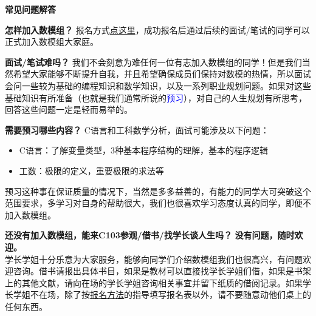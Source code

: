\documentclass[xcolor={usenames,dvipsnames}]{beamer}
\begin{document}
\begin{frame}{\textbf{常见问题解答}}
\begin{alertblock}{\textbf{怎样加入数模组？}}
报名方式\textcolor{red}{\hyperlink{signin}{点这里}}，成功报名后通过后续的面试/笔试的同学可以正式加入数模组大家庭。
\end{alertblock}

\begin{block}{\textbf{面试/笔试难吗？}}
我们不会刻意为难任何一位有志加入数模组的同学！但是我们当然希望大家能够不断提升自我，并且希望确保成员们保持对数模的热情，所以面试会问一些较为基础的编程知识和数学知识，以及一系列职业规划问题。如果对这些基础知识有所准备（也就是我们通常所说的\textcolor{blue}{预习}），对自己的人生规划有所思考，回答这些问题一定是轻而易举的。

\end{block}

\end{frame}

\begin{frame}
\begin{alertblock}{\textbf{需要预习哪些内容？}}
C语言和工科数学分析，面试可能涉及以下问题：
\begin{itemize}
    \item C语言：了解变量类型，3种基本程序结构的理解，基本的程序逻辑
    \item 工数：极限的定义，重要极限的求法等
\end{itemize}
预习这种事在保证质量的情况下，当然是多多益善的，有能力的同学大可突破这个范围要求，多学习对自身的帮助很大，我们也很喜欢学习态度认真的同学，即便不加入数模组。
\end{alertblock}

\begin{block}{\textbf{还没有加入数模组，能来C103参观/借书/找学长谈人生吗？}}
\textbf{没有问题，随时欢迎。}\\
学长学姐十分乐意为大家服务，能够向同学们介绍数模组我们也很高兴，有问题欢迎咨询。借书请报出具体书目，如果是教材可以直接找学长学姐们借，如果是书架上的其他文献，请向在场的学长学姐咨询相关事宜并留下纸质的借阅记录。如果学长学姐不在场，除了按\textcolor{blue}{\hyperlink{signin}{报名方法}}的指导填写报名表以外，请不要随意动他们桌上的任何东西。

\end{block}
\end{frame}
\end{document}
